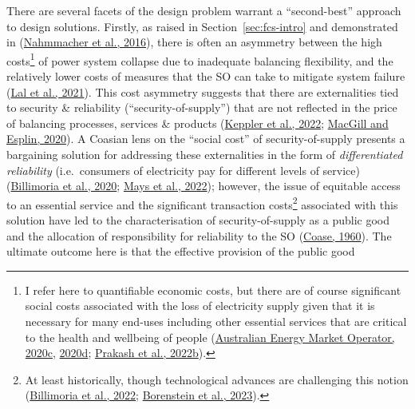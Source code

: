 \documentclass[12pt,a4paper,]{report}
\begin{document}
There are several facets of the design problem warrant a ``second-best''
approach to design solutions. Firstly, as raised in
Section~\ref{sec:fcs-intro} and demonstrated in
(\protect\hyperlink{ref-nahmmacherStrategiesShocksPower2016}{Nahmmacher
et al., 2016}), there is often an asymmetry between the high
costs\footnote{I refer here to quantifiable economic costs, but there
  are of course significant social costs associated with the loss of
  electricity supply given that it is necessary for many end-uses
  including other essential services that are critical to the health and
  wellbeing of people
  (\protect\hyperlink{ref-australianenergymarketoperatorSubmissionAERWALDO2020}{Australian
  Energy Market Operator, 2020c},
  \protect\hyperlink{ref-australianenergymarketoperator2020ISPAppendix2020}{2020d};
  \protect\hyperlink{ref-prakashResponseCapacityMechanism2022}{Prakash
  et al., 2022b}).} of power system collapse due to inadequate balancing
flexibility, and the relatively lower costs of measures that the SO can
take to mitigate system failure
(\protect\hyperlink{ref-lalEssentialSystemServices2021}{Lal et al.,
2021}). This cost asymmetry suggests that there are externalities tied
to security \& reliability (``security-of-supply'') that are not
reflected in the price of balancing processes, services \& products
(\protect\hyperlink{ref-kepplerWhySustainableProvision2022}{Keppler et
al., 2022};
\protect\hyperlink{ref-macgillEndtoendElectricityMarket2020}{MacGill and
Esplin, 2020}). A Coasian lens on the ``social cost'' of
security-of-supply presents a bargaining solution for addressing these
externalities in the form of \emph{differentiated reliability}
(i.e.~consumers of electricity pay for different levels of service)
(\protect\hyperlink{ref-billimoriaMarketDesignSystem2020}{Billimoria et
al., 2020}; \protect\hyperlink{ref-maysPrivateRiskSocial2022}{Mays et
al., 2022}); however, the issue of equitable access to an essential
service and the significant transaction costs\footnote{At least
  historically, though technological advances are challenging this
  notion
  (\protect\hyperlink{ref-billimoriaInsuranceMechanismElectricity2022}{Billimoria
  et al., 2022};
  \protect\hyperlink{ref-borensteinEconomicsElectricityReliability2023}{Borenstein
  et al., 2023}).} associated with this solution have led to the
characterisation of security-of-supply as a public good and the
allocation of responsibility for reliability to the SO
(\protect\hyperlink{ref-coaseProblemSocialCost1960}{Coase, 1960}). The
ultimate outcome here is that the effective provision of the public good
\end{document}
